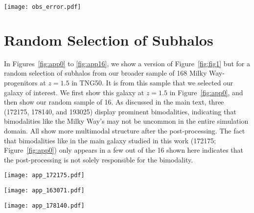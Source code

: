 \documentclass[twocolumn,linenumbers]{aastex631}
\newcommand{\dex}{\ensuremath{\textrm{dex}}}
\begin{document}
\begin{figure*}
  \centering
  \texttt{[image: obs\_error.pdf]}
  \caption{The observational errors of the APOKASC-3 (left) and ASPCAP dataset (right). We show, on the left, a line indicating a $12.5\%$ error in observed age and on the right a vertical line indicating a $0.01\,\dex$ error. On the left, a dashed line indicates the $25\%$ error cut used for inclusion in Figure~\ref{fig:alpha}.}
  \label{fig:obs_err}
\end{figure*}

\section{Random Selection of Subhalos}\label{app:rand_fig1}
In Figures~\ref{fig:app0} to \ref{fig:app16}, we show a version of Figure~\ref{fig:fig1} but for a random selection of subhalos from our broader sample of 168 Milky Way-progenitors at $z=1.5$ in TNG50. It is from this sample that we selected our galaxy of interest. We first show this galaxy at $z=1.5$ in Figure~\ref{fig:app0}, and then show our random sample of 16. As discussed in the main text, three (172175, 178140, and 193025) display prominent bimodalities, indicating that bimodalities like the Milky Way's may not be uncommon in the entire simulation domain. All show more multimodal structure after the post-processing. The fact that bimodalities like in the main galaxy studied in this work (172175; Figure~\ref{fig:app0}) only appears in a few out of the 16 shown here indicates that the post-processing is not solely responsible for the bimodality.

\begin{figure*}
  \centering
  \texttt{[image: app\_172175.pdf]}
  \caption{The same as Figure~\ref{fig:fig1}, but for our galaxy of interest at $z=1.5$.}
  \label{fig:app0}
\end{figure*}

\begin{figure*}
  \centering
  \texttt{[image: app\_163071.pdf]}
  \caption{The same as Figure~\ref{fig:fig1}, but for a random subhalo from our catalog at $z=1.5$.}
  \label{fig:app1}
\end{figure*}

\begin{figure*}
  \centering
  \texttt{[image: app\_178140.pdf]}
  \caption{The same as Figure~\ref{fig:fig1}, but for a random subhalo from our catalog at $z=1.5$.}
  \label{fig:app2}
\end{figure*}
\end{document}

